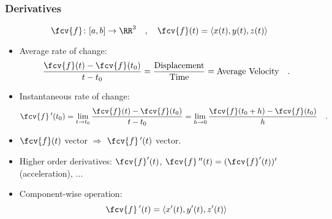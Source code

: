 \begin{frame}
\frametitle{Derivatives}
$$\fcv{f}\colon [a,b]\to \RR^3\quad , \quad \fcv{f}(t) = \langle x(t), y(t), z(t)\rangle$$
\begin{itemize}
\item  Average rate of change: $$\frac{\fcv{f}(t)-\fcv{f}(t_0)}{t-t_0} = \frac{\text{Displacement}}{\text{Time}} = \text{Average Velocity}\quad .$$
\item<2-> Instantaneous rate of change:
\[
\fcv{f}\,'(t_0) = \lim_{t\to t_0} \frac{\fcv{f}(t)-\fcv{f}(t_0)}{t-t_0} = \lim_{h\to 0}\frac{\fcv{f}(t_0+h)-\fcv{f}(t_0)}{h}\quad .
\]
\item<3-> $\fcv{f}(t)$ vector $\Longrightarrow$ $\fcv{f}\,'(t)$ vector.
\item<4-> Higher order derivatives: $\fcv{f}'(t)$, $\fcv{f}\,''(t) = (\fcv{f}'(t))'$ (acceleration), ...
\item<5-> Component-wise operation: $$\fcv{f}\,'(t) = \langle x'(t), y'(t), z'(t)\rangle$$
\end{itemize}

\end{frame}